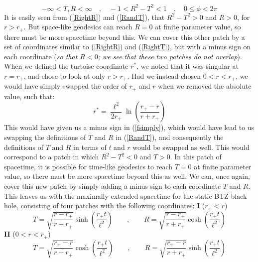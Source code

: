 %
\begin{equation*}
-\infty < T, R < \infty
\quad , \quad
-1 < R^2 - T^2 < 1
\quad , \quad
0 \leq \phi < 2 \pi
\end{equation*}
%
%
%
It is easily seen from (\ref{RightR}) and (\ref{RandT}), that $R^2 - T^2 > 0$ and $R > 0$, for $r > r_+$. But space-like geodesics can reach $R = 0$ at finite parameter value, so there must be more spacetime beyond this. We can cover this other patch by a set of coordinates similar to (\ref{RightR}) and (\ref{RightT}), but with a minus sign on each coordinate (\textit{so that $R < 0$; we see that these two patches do not overlap}). \newline
When we defined the turtoise coordinate $r^*$, we noted that it was singular at $r = r_+$, and chose to look at only $r > r_+$. Had we instead chosen $0 < r < r_+$, we would have simply swapped the order of $r_+$ and $r$ when we removed the absolute value, such that:
%
%
\begin{equation}
r^* = \frac{\ell^2}{2 r_+} \ln \left( \frac{r_+ - r}{r + r_+} \right)
\end{equation}
%
%
This would have given us a minus sign in (\ref{fsimply}), which would have lead to us swapping the definitions of $T$ and $R$ in (\ref{RandT}), and consequently the definitions of $T$ and $R$ in terms of $t$ and $r$ would be swapped as well. This would correspond to a patch in which $R^2 - T^2 < 0$ and $T > 0$. In this patch of spacetime, it is possible for time-like geodesics to reach $T = 0$ at finite parameter value, so there must be more spacetime beyond this as well. We can, once again, cover this new patch by simply adding a minus sign to each coordinate $T$ and $R$. This leaves us with the maximally extended spacetime for the static BTZ black hole, consisting of four patches with the following coordinates:\newline
\newline
%
%
\noindent
\textbf{I} \qquad ($r_+ < r$)
%
\begin{equation}
T = \sqrt{\frac{r - r_+}{r + r_+}} \sinh \left( \frac{r_+ t}{\ell^2}\right)
\qquad , \qquad
R = \sqrt{\frac{r - r_+}{r + r_+}} \cosh \left( \frac{r_+ t}{\ell^2}\right)
\end{equation}
%
%
\textbf{II} \qquad ($0 < r < r_+$)
%
\begin{equation}
T = \sqrt{\frac{r_+ - r}{r + r_+}} \cosh \left( \frac{r_+ t}{\ell^2}\right)
\qquad , \qquad
R = \sqrt{\frac{r_+ - r}{r + r_+}} \sinh \left( \frac{r_+ t}{\ell^2}\right)
\end{equation}
